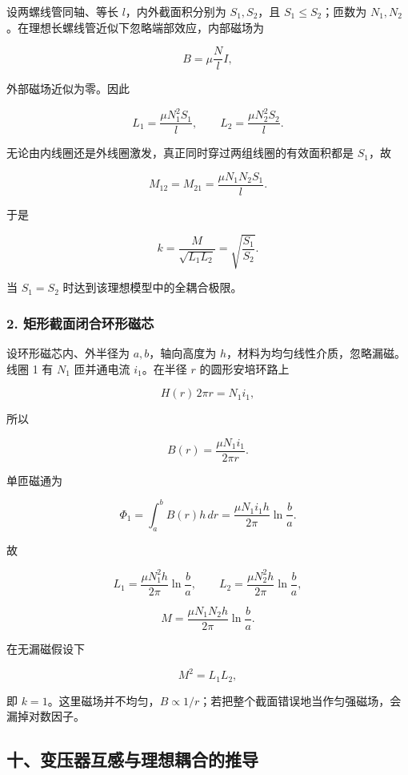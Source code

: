 设两螺线管同轴、等长 \(l\)，内外截面积分别为 \(S_1,S_2\)，且
\(S_1\le S_2\)；匝数为
\(N_1,N_2\)。在理想长螺线管近似下忽略端部效应，内部磁场为

\[
B=\mu\frac{N}{l}I,
\]

外部磁场近似为零。因此

\[
L_1=\frac{\mu N_1^2S_1}{l},
\qquad
L_2=\frac{\mu N_2^2S_2}{l}.
\tag{57-48}
\]

无论由内线圈还是外线圈激发，真正同时穿过两组线圈的有效面积都是
\(S_1\)，故

\[
M_{12}=M_{21}=\frac{\mu N_1N_2S_1}{l}.
\tag{57-49}
\]

于是

\[
k=\frac{M}{\sqrt{L_1L_2}}
=\sqrt{\frac{S_1}{S_2}}.
\tag{57-50}
\]

当 \(S_1=S_2\) 时达到该理想模型中的全耦合极限。

\subsubsection{2.
矩形截面闭合环形磁芯}\label{m6:ux77e9ux5f62ux622aux9762ux95edux5408ux73afux5f62ux78c1ux82af}

设环形磁芯内、外半径为 \(a,b\)，轴向高度为
\(h\)，材料为均匀线性介质，忽略漏磁。线圈 1 有 \(N_1\) 匝并通电流
\(i_1\)。在半径 \(r\) 的圆形安培环路上

\[
H(r)\,2\pi r=N_1i_1,
\]

所以

\[
B(r)=\frac{\mu N_1i_1}{2\pi r}.
\tag{57-51}
\]

单匝磁通为

\[
\Phi_1=\int_a^bB(r)h\,dr
=\frac{\mu N_1i_1h}{2\pi}\ln\frac ba.
\]

故

\[
L_1=\frac{\mu N_1^2h}{2\pi}\ln\frac ba,
\qquad
L_2=\frac{\mu N_2^2h}{2\pi}\ln\frac ba,
\tag{57-52}
\]

\[
M=\frac{\mu N_1N_2h}{2\pi}\ln\frac ba.
\tag{57-53}
\]

在无漏磁假设下

\[
M^2=L_1L_2,
\]

即
\(k=1\)。这里磁场并不均匀，\(B\propto1/r\)；若把整个截面错误地当作匀强磁场，会漏掉对数因子。

\subsection{十、变压器互感与理想耦合的推导}\label{m6:ux5341ux53d8ux538bux5668ux4e92ux611fux4e0eux7406ux60f3ux8026ux5408ux7684ux63a8ux5bfc}

